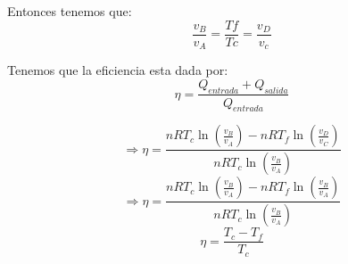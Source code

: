 \begin{enumerate}[label=\textbf{\alph*)}]
            Entonces tenemos que:
            \[ \frac{v_B}{v_A}=\frac{Tf}{Tc}=\frac{v_D}{v_c}\]

            Tenemos que la eficiencia esta dada por:
            \[ \eta = \frac{Q_{entrada}+ Q_{salida}}{Q_{entrada}}\]

            \[\Rightarrow  \eta = \frac{nRT_c \ln \left( \frac{v_B}{v_A}\right)-nRT_f \ln \left( \frac{v_D}{v_C}\right)}{nRT_c \ln \left( \frac{v_B}{v_A}\right)}\]
            \[\Rightarrow  \eta = \frac{nRT_c \ln \left( \frac{v_B}{v_A}\right)-nRT_f \ln \left( \frac{v_B}{v_A}\right)}{nRT_c \ln \left( \frac{v_B}{v_A}\right)}\]
            \[\eta =\frac{T_c-T_f}{T_c}\]





\end{enumerate}
